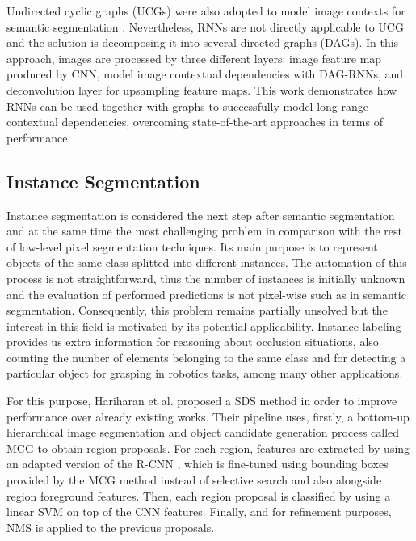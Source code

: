 Undirected cyclic graphs (UCGs) were also adopted to model image contexts for semantic segmentation \cite{Shuai2015}. Nevertheless, \acp{RNN} are not directly applicable to UCG and the solution is decomposing it into several directed graphs (DAGs). In this approach, images are processed by three different layers: image feature map produced by \acs{CNN}, model image contextual dependencies with DAG-RNNs, and deconvolution layer for upsampling feature maps. This work demonstrates how \acp{RNN} can be used together with graphs to successfully model long-range contextual dependencies, overcoming state-of-the-art approaches in terms of performance.

\subsection{Instance Segmentation}

Instance segmentation is considered the next step after semantic segmentation and at the same time the most challenging problem in comparison with the rest of low-level pixel segmentation techniques. Its main purpose is to represent objects of the same class splitted into different instances. The automation of this process is not straightforward, thus the number of instances is initially unknown and the evaluation of performed predictions is not pixel-wise such as in semantic segmentation. Consequently, this problem remains partially unsolved but the interest in this field is motivated by its potential applicability. Instance labeling provides us extra information for reasoning about occlusion situations, also counting the number of elements belonging to the same class and for detecting a particular object for grasping in robotics tasks, among many other applications.

For this purpose, Hariharan et al. \cite{Hariharan2014} proposed a \ac{SDS} method in order to improve performance over already existing works. Their pipeline uses, firstly, a bottom-up hierarchical image segmentation and object candidate generation process called \ac{MCG} \cite{Arbelaez2014} to obtain region proposals. For each region, features are extracted by using an adapted version of the \ac{R-CNN} \cite{Girshick2014}, which is fine-tuned using bounding boxes provided by the \ac{MCG} method instead of selective search and also alongside region foreground features. Then, each region proposal is classified by using a linear \ac{SVM} on top of the \acs{CNN} features. Finally, and for refinement purposes, \ac{NMS} is applied to the previous proposals.


